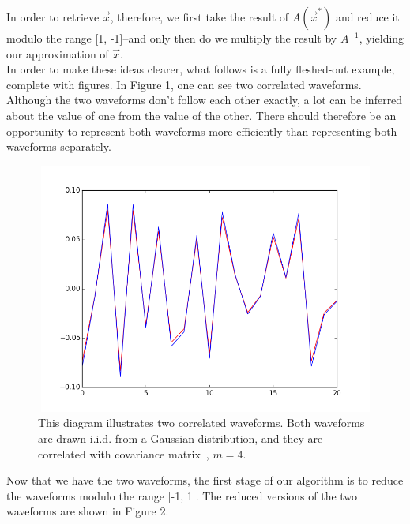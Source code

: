 \documentclass{amsart}
\begin{document}
In order to retrieve $\vec{x}$, therefore, we first take the result of $A(\vec{x}^*)$ and reduce it modulo the range [1, -1]--and only then do we multiply the result by $A^{-1}$, yielding our approximation of $\vec{x}$. \\

In order to make these ideas clearer, what follows is a fully fleshed-out example, complete with figures. In Figure 1, one can see two correlated waveforms. Although the two waveforms don't follow each other exactly, a lot can be inferred about the value of one from the value of the other. There should therefore be an opportunity to represent both waveforms more efficiently than representing both waveforms separately. \\

\begin{figure} 
\begin{center} 
\includegraphics[height=3.25in,width=5in,angle=0]{originals.png} 
\caption{This diagram illustrates two correlated waveforms. Both waveforms are drawn i.i.d. from a Gaussian distribution, and they are correlated with covariance matrix~\usebox{\covmat}, $m=4$.}
\end{center} 
\end{figure}  

Now that we have the two waveforms, the first stage of our algorithm is to reduce the waveforms modulo the range [-1, 1]. The reduced versions of the two waveforms are shown in Figure 2. \\
\end{document}

